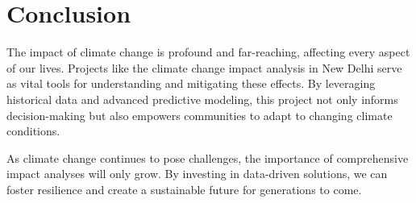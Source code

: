 \documentclass{article}
\begin{document}
\section{Conclusion}

The impact of climate change is profound and far-reaching, affecting every aspect of our lives. Projects like the climate change impact analysis in New Delhi serve as vital tools for understanding and mitigating these effects. By leveraging historical data and advanced predictive modeling, this project not only informs decision-making but also empowers communities to adapt to changing climate conditions.

As climate change continues to pose challenges, the importance of comprehensive impact analyses will only grow. By investing in data-driven solutions, we can foster resilience and create a sustainable future for generations to come.
\end{document}
